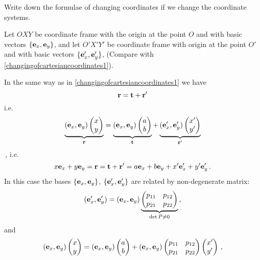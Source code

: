 \documentclass[12pt]{article}
\numberwithin{equation}{section}
\begin{document}
\m


Write down the formulae of changing coordinates
if we change the coordinate systems.

Let $OXY$ be coordinate frame with the origin at the point
$O$ and with basic vectors $\{{\bf e}_x,{\bf e}_y\}$,
and let $O'X'Y'$ be coordinate frame with origin at the point
$O'$ and with basic vectors $\{{\bf e}'_x,{\bf e}'_y\}$,
(Compare with \eqref{changingofcartesiancoordinates1}).

In the same way as in \eqref{changingofcartesiancoordinates1} 
we have  \begin{equation*}
  {\bf r}={\bf t}+{\bf r}'  
  \end{equation*}
i.e.
 \begin{equation*}
      \underbrace
            {
  ({\bf e}_x,{\bf e}_y)
  \begin{pmatrix}
         x \cr
        y\cr
   \end{pmatrix}
     }_{{\bf r}}
            =
        \underbrace
         {
  ({\bf e}_x,{\bf e}_y)
      \begin{pmatrix}
         a \cr
        b\cr
   \end{pmatrix}
          }_{\bf t}
          +
      \underbrace
         {
  ({\bf e}'_x,{\bf e}'_y)
      \begin{pmatrix}
         x' \cr
        y'\cr
   \end{pmatrix}
          }_{\bf {\bf r}'}
\end{equation*}\,,
i.e.
  \begin{equation*}
  x{\bf e}_x+y{\bf e}_y={\bf r}={\bf t}+{\bf r}'=a{\bf e}_x+b{\bf e}_y+x'{\bf e}'_x+y'{\bf e}'_y\,.
  \end{equation*}
In this case the bases $\{{\bf e}_x,{\bf e}_y\}$, $\{{\bf e}'_x,{\bf e}'_y\}$
are related by non-degenerate  matrix:
      \begin{equation}\label{matrixnondegenerate1}
  ({\bf e}'_x,{\bf e}'_y)=({\bf e}_x,{\bf e}_y)
\underbrace
        {
     \begin{pmatrix}
    p_{11} &p_{12}\cr
    p_{21} &p_{22}\cr
\end{pmatrix}
     }_{\det P\not=0}\,,
    \end{equation}
and
 \begin{equation*}
  ({\bf e}_x,{\bf e}_y)
  \begin{pmatrix}
         x \cr
        y\cr
   \end{pmatrix}
=  ({\bf e}_x,{\bf e}_y)
  \begin{pmatrix}
         a \cr
        b\cr
   \end{pmatrix}
              +  
 ({\bf e}_x,{\bf e}_y)
      \begin{pmatrix}
    p_{11} &p_{12}\cr
    p_{21} &p_{22}\cr
         \end{pmatrix}
           \begin{pmatrix}
         x'\cr
        y'\cr
   \end{pmatrix}\,,
\end{equation*}
\end{document}
